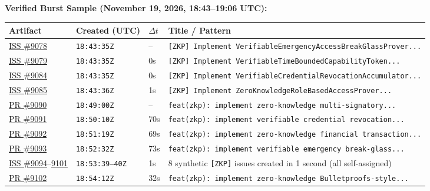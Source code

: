 \documentclass[11pt,a4paper]{article}
\begin{document}
\vspace{4pt}
\noindent\textbf{Verified Burst Sample (November 19, 2026, 18:43--19:06 UTC):}
\begin{center}
\small
\begin{tabular}{@{}lll p{7.8cm}@{}}
\toprule
\textbf{Artifact} & \textbf{Created (UTC)} & \textbf{$\Delta t$} & \textbf{Title / Pattern} \\
\midrule
\href{https://github.com/SatyamPandey-07/WorkSphere/issues/9078}{ISS \#9078} & \texttt{18:43:35Z} & -- & \texttt{[ZKP] Implement VerifiableEmergencyAccessBreakGlassProver...} \\
\href{https://github.com/SatyamPandey-07/WorkSphere/issues/9079}{ISS \#9079} & \texttt{18:43:35Z} & 0s & \texttt{[ZKP] Implement VerifiableTimeBoundedCapabilityToken...} \\
\href{https://github.com/SatyamPandey-07/WorkSphere/issues/9084}{ISS \#9084} & \texttt{18:43:35Z} & 0s & \texttt{[ZKP] Implement VerifiableCredentialRevocationAccumulator...} \\
\href{https://github.com/SatyamPandey-07/WorkSphere/issues/9085}{ISS \#9085} & \texttt{18:43:36Z} & 1s & \texttt{[ZKP] Implement ZeroKnowledgeRoleBasedAccessProver...} \\
\href{https://github.com/SatyamPandey-07/WorkSphere/pull/9090}{PR \#9090} & \texttt{18:49:00Z} & -- & \texttt{feat(zkp): implement zero-knowledge multi-signatory...} \\
\href{https://github.com/SatyamPandey-07/WorkSphere/pull/9091}{PR \#9091} & \texttt{18:50:10Z} & 70s & \texttt{feat(zkp): implement verifiable credential revocation...} \\
\href{https://github.com/SatyamPandey-07/WorkSphere/pull/9092}{PR \#9092} & \texttt{18:51:19Z} & 69s & \texttt{feat(zkp): implement zero-knowledge financial transaction...} \\
\href{https://github.com/SatyamPandey-07/WorkSphere/pull/9093}{PR \#9093} & \texttt{18:52:32Z} & 73s & \texttt{feat(zkp): implement verifiable emergency break-glass...} \\
\href{https://github.com/SatyamPandey-07/WorkSphere/issues/9094}{ISS \#9094}--\href{https://github.com/SatyamPandey-07/WorkSphere/issues/9101}{9101} & \texttt{18:53:39--40Z} & 1s & 8 synthetic \texttt{[ZKP]} issues created in 1 second (all self-assigned) \\
\href{https://github.com/SatyamPandey-07/WorkSphere/pull/9102}{PR \#9102} & \texttt{18:54:12Z} & 32s & \texttt{feat(zkp): implement zero-knowledge Bulletproofs-style...} \\

\end{tabular}
\end{center}
\end{document}
